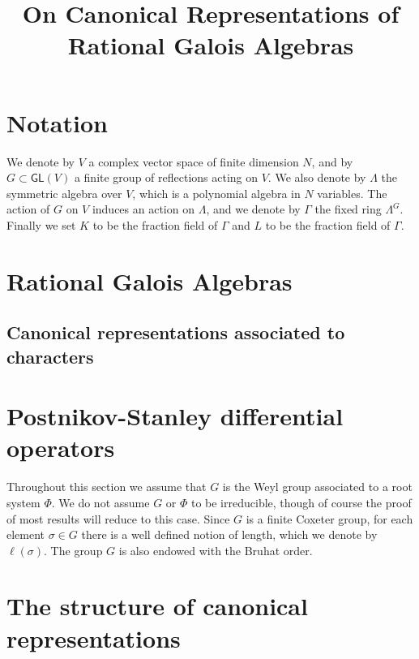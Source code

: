 \documentclass[11pt,fleqn]{article}
\title{On Canonical Representations of Rational Galois Algebras}
\date{}
\begin{document}
\maketitle

\section{Notation}
We denote by $V$ a complex vector space of finite dimension $N$, and by $G
\subset \mathsf{GL}(V)$ a finite group of reflections acting on $V$. We also
denote by $\Lambda$ the symmetric algebra over $V$, which is a polynomial
algebra in $N$ variables. The action of $G$ on $V$ induces an action on 
$\Lambda$, and we denote by $\Gamma$ the fixed ring $\Lambda^G$. Finally we set
$K$ to be the fraction field of $\Gamma$ and $L$ to be the fraction field of
$\Gamma$.

\section{Rational Galois Algebras}

\subsection{Canonical representations associated to characters}

\newpage
\section{Postnikov-Stanley differential operators}
Throughout this section we assume that $G$ is the Weyl group associated to a 
root system $\Phi$. We do not assume $G$ or $\Phi$ to be irreducible, though
of course the proof of most results will reduce to this case. Since $G$ is a
finite Coxeter group, for each element $\sigma \in G$ there is a well defined
notion of length, which we denote by $\ell(\sigma)$. The group $G$ is also
endowed with the Bruhat order.


\newpage
\section{The structure of canonical representations}
\end{document}
